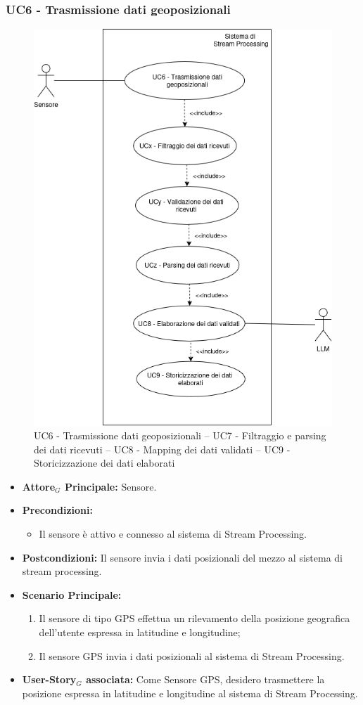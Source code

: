 \documentclass[11pt]{article}
\begin{document}
\begin{justify}
\subsubsection{\textbf{UC6 - Trasmissione dati geoposizionali}}
\begin{figure}[H]
    \centering
    \includegraphics[width=0.7\linewidth]{UC6-7-8-9image.png}
    \caption{UC6 - Trasmissione dati geoposizionali -- UC7 - Filtraggio e parsing dei dati ricevuti -- UC8 - Mapping dei dati validati -- UC9 - Storicizzazione dei dati elaborati}
    \label{fig:UC6789}
\end{figure}
\label{UC6}
\begin{itemize}
    \item \textbf{Attore$_G$ Principale:} Sensore.
    \item \textbf{Precondizioni:} 
        \begin{itemize}
    	\item Il sensore è attivo e connesso al sistema di Stream Processing.
        \end{itemize}
    \item \textbf{Postcondizioni:} Il sensore invia i dati posizionali del mezzo al sistema di stream processing.
    \item \textbf{Scenario Principale:} 
        \begin{enumerate}
            \item Il sensore di tipo GPS effettua un rilevamento della posizione geografica dell'utente espressa in latitudine e longitudine;
            \item Il sensore GPS invia i dati posizionali al sistema di Stream Processing.
        \end{enumerate}
    \item \textbf{User-Story$_G$ associata:} Come Sensore GPS, desidero trasmettere la posizione espressa in latitudine e longitudine al sistema di Stream Processing.


\end{itemize}
\end{justify}
\end{document}
